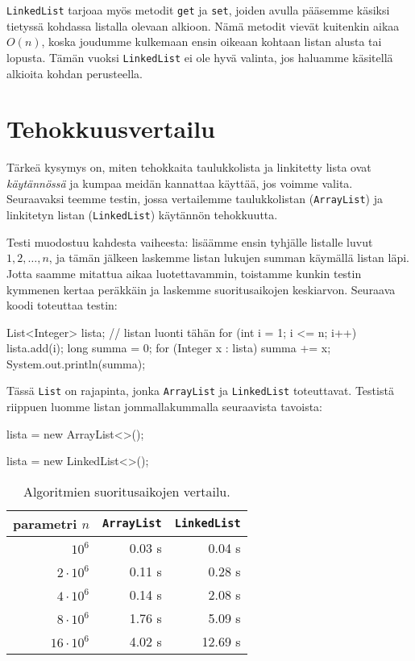\texttt{LinkedList} tarjoaa myös metodit
\texttt{get} ja \texttt{set}, joiden avulla
pääsemme käsiksi tietyssä kohdassa listalla olevaan alkioon.
Nämä metodit vievät kuitenkin aikaa $O(n)$,
koska joudumme kulkemaan ensin oikeaan kohtaan listan
alusta tai lopusta.
Tämän vuoksi \texttt{LinkedList} ei ole hyvä valinta,
jos haluamme käsitellä alkioita kohdan perusteella.

\section{Tehokkuusvertailu}

Tärkeä kysymys on, miten tehokkaita taulukkolista ja
linkitetty lista ovat \emph{käytännössä} ja kumpaa meidän
kannattaa käyttää, jos voimme valita.
Seuraavaksi teemme testin, jossa vertailemme taulukkolistan
(\texttt{ArrayList}) ja linkitetyn listan (\texttt{LinkedList})
käytännön tehokkuutta.

Testi muodostuu kahdesta vaiheesta:
lisäämme ensin tyhjälle listalle luvut $1,2,\dots,n$,
ja tämän jälkeen laskemme listan lukujen summan
käymällä listan läpi.
Jotta saamme mitattua aikaa luotettavammin,
toistamme kunkin testin kymmenen kertaa peräkkäin
ja laskemme suoritusaikojen keskiarvon.
Seuraava koodi toteuttaa testin:

\begin{code}
List<Integer> lista;
// listan luonti tähän
for (int i = 1; i <= n; i++) {
    lista.add(i);
}
long summa = 0;
for (Integer x : lista) summa += x;
System.out.println(summa);
\end{code}

Tässä \texttt{List} on rajapinta, jonka
\texttt{ArrayList} ja \texttt{LinkedList} toteuttavat.
Testistä riippuen luomme listan jommallakummalla
seuraavista tavoista:

\begin{code}
lista = new ArrayList<>();
\end{code}

\begin{code}
lista = new LinkedList<>();
\end{code}

\begin{table}
\center
\begin{tabular}{rrr}
parametri $n$ & \texttt{ArrayList} & \texttt{LinkedList} \\
\hline
$10^6$ & 0.03 s & 0.04 s \\
$2 \cdot 10^6$ & 0.11 s & 0.28 s \\
$4 \cdot 10^6$ & 0.14 s & 2.08 s \\
$8 \cdot 10^6$ & 1.76 s & 5.09 s \\
$16 \cdot 10^6$ & 4.02 s & 12.69 s \\
\end{tabular}
\caption{Algoritmien suoritusaikojen vertailu.}
\label{tab:lispoi}
\end{table}

